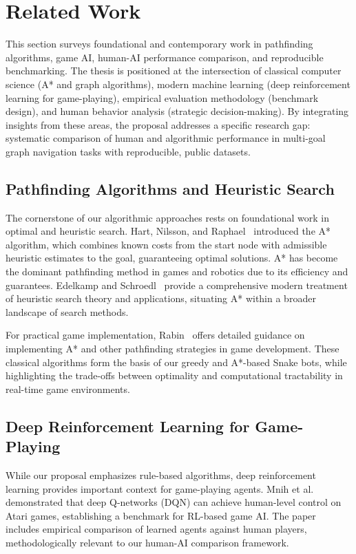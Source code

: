 \documentclass[a4paper]{article}
\begin{document}
\section{Related Work}

This section surveys foundational and contemporary work in pathfinding algorithms, game AI, human-AI performance comparison, and reproducible benchmarking. The thesis is positioned at the intersection of classical computer science (A* and graph algorithms), modern machine learning (deep reinforcement learning for game-playing), empirical evaluation methodology (benchmark design), and human behavior analysis (strategic decision-making). By integrating insights from these areas, the proposal addresses a specific research gap: systematic comparison of human and algorithmic performance in multi-goal graph navigation tasks with reproducible, public datasets.

\subsection{Pathfinding Algorithms and Heuristic Search}

The cornerstone of our algorithmic approaches rests on foundational work in optimal and heuristic search. Hart, Nilsson, and Raphael~\cite{Hart1968} introduced the A* algorithm, which combines known costs from the start node with admissible heuristic estimates to the goal, guaranteeing optimal solutions. A* has become the dominant pathfinding method in games and robotics due to its efficiency and guarantees. Edelkamp and Schroedl~\cite{Edelkamp2011} provide a comprehensive modern treatment of heuristic search theory and applications, situating A* within a broader landscape of search methods.

For practical game implementation, Rabin~\cite{Rabin2013} offers detailed guidance on implementing A* and other pathfinding strategies in game development. These classical algorithms form the basis of our greedy and A*-based Snake bots, while highlighting the trade-offs between optimality and computational tractability in real-time game environments.

\subsection{Deep Reinforcement Learning for Game-Playing}

While our proposal emphasizes rule-based algorithms, deep reinforcement learning provides important context for game-playing agents. Mnih et al.~\cite{Mnih2015} demonstrated that deep Q-networks (DQN) can achieve human-level control on Atari games, establishing a benchmark for RL-based game AI. The paper includes empirical comparison of learned agents against human players, methodologically relevant to our human-AI comparison framework.
\end{document}
